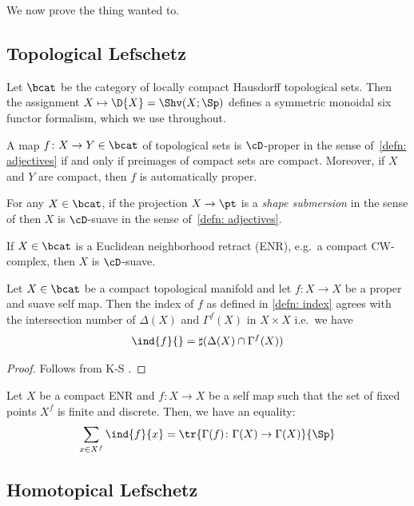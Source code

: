 We now prove the thing wanted to.

\subsection{Topological Lefschetz}

Let $\bcat$ be the category of locally compact Hausdorff topological sets. Then the assignment
$X\mapsto \D{X}=\Shv(X;\Sp)$ defines a symmetric monoidal six functor formalism, 
which we use throughout.

\begin{lem}
  A map $f\colon X\to Y \in \bcat$ of topological sets is $\cD$-proper in the sense of~\ref{defn: adjectives} if
  and only if preimages of compact sets are compact. Moreover, if $X$ and $Y$ are compact,
  then $f$ is automatically proper.
\end{lem}

\begin{prop}
  For any $X\in \bcat$, if the projection $X\to \pt$ is a \textit{shape submersion} in the
  sense of  then $X$ is $\cD$-suave in the sense of~\ref{defn: adjectives}.
\end{prop}

\begin{cor}
If $X\in \bcat$ is a Euclidean neighborhood retract (ENR), e.g.~a compact CW-complex, then $X$
is $\cD$-suave.
\end{cor}

\begin{lem}
  Let $X\in \bcat$ be a compact topological manifold and let $f\colon X\to X$ be a proper
  and suave self map. Then the index of $f$ as defined in \cref{defn: index}
  agrees with the intersection number of $\Delta(X)$ and $\Gamma^{f}(X)$ in $X\times X$
  i.e.~we have
  \[ \ind{f}{}= \sharp(\Delta(X)\cap \Gamma^{f}(X))\]
\end{lem}
\begin{proof}
Follows from K-S .
\end{proof}

\begin{thm}
  Let $X$ be a compact ENR and $f\colon X\to X$ be a self map such that the
  set of fixed points $X^{f}$ is finite and discrete. Then, we have an equality:
  \[ \sum_{x\in X^{f}} \ind{f}{x}= \tr{\Gamma(f)\colon \Gamma(X)\to \Gamma(X)}{\Sp}\]
\end{thm}


\subsection{Homotopical Lefschetz}

